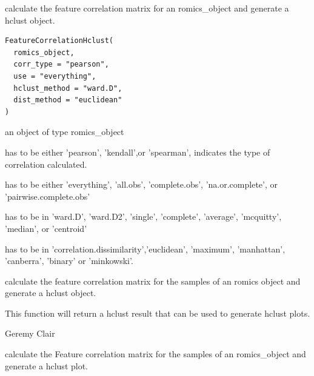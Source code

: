 \documentclass[a4paper]{book}
\begin{document}
%
\begin{Description}
calculate the feature correlation matrix for an romics\_object and generate a hclust object.
\end{Description}
%
\begin{Usage}
\begin{verbatim}
FeatureCorrelationHclust(
  romics_object,
  corr_type = "pearson",
  use = "everything",
  hclust_method = "ward.D",
  dist_method = "euclidean"
)
\end{verbatim}
\end{Usage}
%
\begin{Arguments}
\begin{ldescription}
\item[\code{romics\_object}] an object of type romics\_object

\item[\code{corr\_type}] has to be either 'pearson', 'kendall',or 'spearman', indicates the type of correlation calculated.

\item[\code{use}] has to be either 'everything', 'all.obs', 'complete.obs', 'na.or.complete', or 'pairwise.complete.obs'

\item[\code{hclust\_method}] has to be in 'ward.D', 'ward.D2', 'single', 'complete', 'average', 'mcquitty', 'median', or 'centroid'

\item[\code{dist\_method}] has to be in 'correlation.dissimilarity','euclidean', 'maximum', 'manhattan', 'canberra', 'binary' or 'minkowski'.
\end{ldescription}
\end{Arguments}
%
\begin{Details}
calculate the feature correlation matrix for the samples of an romics object and generate a hclust object.
\end{Details}
%
\begin{Value}
This function will return a hclust result that can be used to generate hclust plots.
\end{Value}
%
\begin{Author}
Geremy Clair
\end{Author}
%
\begin{Description}
calculate the Feature correlation matrix for the samples of an romics\_object and generate a hclust plot.
\end{Description}
\end{document}
